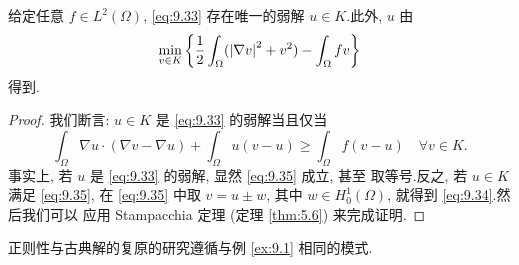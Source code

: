 \begin{keyproposition}
\label{prop:9.22}
给定任意 $f\in L^2(\Omega)$, \eqref{eq:9.33} 存在唯一的弱解
$u\in K$.此外, $u$ 由
\begin{equation*}
\min_{v\in K}\left\{\frac12\int_\Omega
(\left|\nabla v\right|^2+v^2)-\int_\Omega fv\right\}
\end{equation*}
得到.
\end{keyproposition}

\begin{proof}
我们断言: $u\in K$ 是 \eqref{eq:9.33} 的弱解当且仅当
\begin{equation}
\int_\Omega\nabla u\cdot(\nabla v-\nabla u)+\int_\Omega u(v-u)
\ge\int_\Omega f(v-u)\quad\forall v\in K.
\label{eq:9.35}
\end{equation}
事实上, 若 $u$ 是 \eqref{eq:9.33} 的弱解, 显然 \eqref{eq:9.35} 成立, 甚至
取等号.反之, 若 $u\in K$ 满足 \eqref{eq:9.35}, 在 \eqref{eq:9.35} 中取
$v=u\pm w$, 其中 $w\in H_0^1(\Omega)$, 就得到 \eqref{eq:9.34}.然后我们可以
应用 Stampacchia 定理 (定理  \ref{thm:5.6}) 来完成证明.
\end{proof}

正则性与古典解的复原的研究遵循与例 \ref{ex:9.1} 相同的模式.

